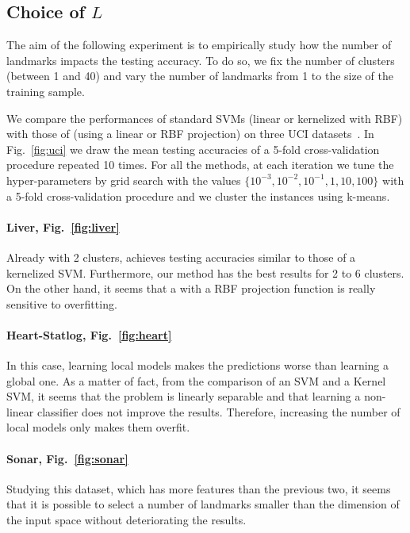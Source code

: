 \subsection{Choice of $L$}

The aim of the following experiment is to empirically study how the number of landmarks impacts the testing accuracy. To do so, we fix the number of clusters (between 1 and 40) and vary the number of landmarks from 1 to the size of the training sample.

We compare the performances of standard SVMs (linear or kernelized with RBF) with those of \landSVM (using a linear or RBF projection) on three UCI datasets~\cite{Lichman:2013}. In Fig.~\ref{fig:uci} we draw the mean testing accuracies of a 5-fold cross-validation procedure repeated 10 times. For all the methods, at each iteration we tune the hyper-parameters by grid search with the values $\{10^{-3},10^{-2},10^{-1},1,10,100 \}$ with a 5-fold cross-validation procedure and we cluster the instances using k-means.

\paragraph{Liver, Fig.~\ref{fig:liver}} Already with 2 clusters, \landSVM achieves testing accuracies similar to those of a kernelized SVM. Furthermore, our method has the best results for 2 to 6 clusters. On the other hand, it seems that a \landSVM with a RBF projection function is really sensitive to overfitting.


\paragraph{Heart-Statlog, Fig.~\ref{fig:heart}} In this case, learning local models makes the predictions worse than learning a global one. As a matter of fact, from the comparison of an SVM and a Kernel SVM, it seems that the problem is linearly separable and that learning a non-linear classifier does not improve the results. Therefore, increasing the number of local models only makes them overfit.

\paragraph{Sonar, Fig.~\ref{fig:sonar}} Studying this dataset, which has more features than the previous two, it seems that it is possible to select a number of landmarks smaller than the dimension of the input space without deteriorating the results.

